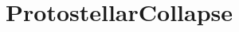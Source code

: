 \documentclass{book}
\begin{document}
\subsection{\cello}

\section{ProtostellarCollapse} \label{s:ProtostellarCollapse}

\subsection{\enzo}
\end{document}
